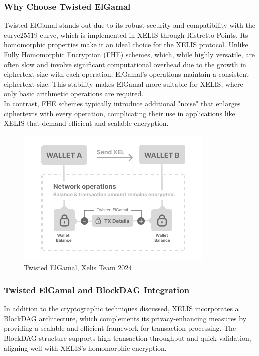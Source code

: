\documentclass[10pt,a4paper,twocolumn]{article}
\begin{document}
\subsubsection{Why Choose Twisted ElGamal}

Twisted ElGamal stands out due to its robust security and compatibility with the curve25519 curve, which is implemented in XELIS through Ristretto Points. Its homomorphic properties make it an ideal choice for the XELIS protocol. Unlike Fully Homomorphic Encryption (FHE) schemes, which, while highly versatile, are often slow and involve significant computational overhead due to the growth in ciphertext size with each operation, ElGamal’s operations maintain a consistent ciphertext size. This stability makes ElGamal more suitable for XELIS, where only basic arithmetic operations are required.\\

In contrast, FHE schemes typically introduce additional "noise" that enlarges ciphertexts with every operation, complicating their use in applications like XELIS that demand efficient and scalable encryption.\\

\begin{figure}
    \centering
    \includegraphics[width=0.9\linewidth]{ElGamal Homomorphic XEL (1).png}
    \caption{Twisted ElGamal, Xelis Team 2024}
    \label{fig:enter-label}
\end{figure}


\subsubsection{Twisted ElGamal and BlockDAG Integration}

In addition to the cryptographic techniques discussed, XELIS incorporates a BlockDAG architecture, which complements its privacy-enhancing measures by providing a scalable and efficient framework for transaction processing. The BlockDAG structure supports high transaction throughput and quick validation, aligning well with XELIS’s homomorphic encryption.\\
\end{document}
